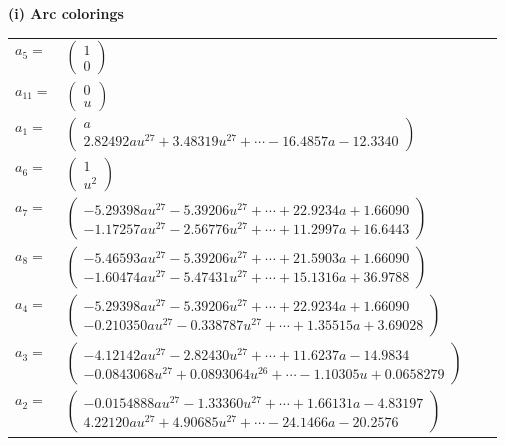 \documentclass[1p]{elsarticle_modified}
\theoremstyle{definition}
\begin{document}
\flushleft \textbf{(i) Arc colorings}\\
\begin{tabular}{m{7pt} m{180pt} m{7pt} m{180pt} }
\flushright $a_{5}=$&$\begin{pmatrix}1\\0\end{pmatrix}$ \\
\flushright $a_{11}=$&$\begin{pmatrix}0\\u\end{pmatrix}$ \\
\flushright $a_{1}=$&$\begin{pmatrix}a\\2.82492 a u^{27}+3.48319 u^{27}+\cdots-16.4857 a-12.3340\end{pmatrix}$ \\
\flushright $a_{6}=$&$\begin{pmatrix}1\\u^2\end{pmatrix}$ \\
\flushright $a_{7}=$&$\begin{pmatrix}-5.29398 a u^{27}-5.39206 u^{27}+\cdots+22.9234 a+1.66090\\-1.17257 a u^{27}-2.56776 u^{27}+\cdots+11.2997 a+16.6443\end{pmatrix}$ \\
\flushright $a_{8}=$&$\begin{pmatrix}-5.46593 a u^{27}-5.39206 u^{27}+\cdots+21.5903 a+1.66090\\-1.60474 a u^{27}-5.47431 u^{27}+\cdots+15.1316 a+36.9788\end{pmatrix}$ \\
\flushright $a_{4}=$&$\begin{pmatrix}-5.29398 a u^{27}-5.39206 u^{27}+\cdots+22.9234 a+1.66090\\-0.210350 a u^{27}-0.338787 u^{27}+\cdots+1.35515 a+3.69028\end{pmatrix}$ \\
\flushright $a_{3}=$&$\begin{pmatrix}-4.12142 a u^{27}-2.82430 u^{27}+\cdots+11.6237 a-14.9834\\-0.0843068 u^{27}+0.0893064 u^{26}+\cdots-1.10305 u+0.0658279\end{pmatrix}$ \\
\flushright $a_{2}=$&$\begin{pmatrix}-0.0154888 a u^{27}-1.33360 u^{27}+\cdots+1.66131 a-4.83197\\4.22120 a u^{27}+4.90685 u^{27}+\cdots-24.1466 a-20.2576\end{pmatrix}$ \\

\end{tabular}
\end{document}
